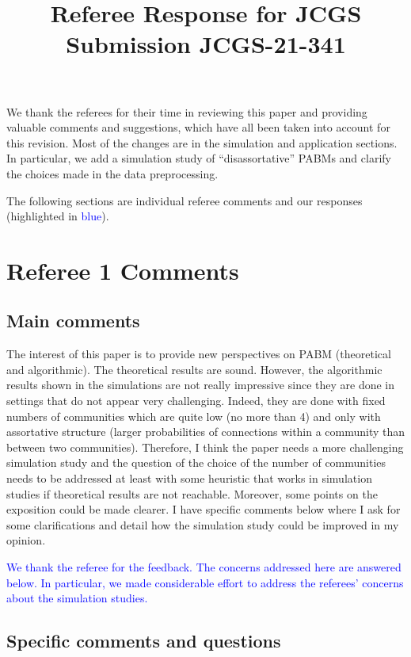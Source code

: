\documentclass[
]{article}
\title{Referee Response for JCGS Submission JCGS-21-341}
\author{}
\date{\vspace{-2.5em}}
\begin{document}
\maketitle

We thank the referees for their time in reviewing this paper and
providing valuable comments and suggestions, which have all been taken
into account for this revision. Most of the changes are in the
simulation and application sections. In particular, we add a simulation
study of ``disassortative'' PABMs and clarify the choices made in the
data preprocessing.

The following sections are individual referee comments and our responses
(highlighted in \textcolor{blue}{blue}).

\hypertarget{referee-1-comments}{%
\section{Referee 1 Comments}\label{referee-1-comments}}

\hypertarget{main-comments}{%
\subsection{Main comments}\label{main-comments}}

The interest of this paper is to provide new perspectives on PABM
(theoretical and algorithmic). The theoretical results are sound.
However, the algorithmic results shown in the simulations are not really
impressive since they are done in settings that do not appear very
challenging. Indeed, they are done with fixed numbers of communities
which are quite low (no more than 4) and only with assortative structure
(larger probabilities of connections within a community than between two
communities). Therefore, I think the paper needs a more challenging
simulation study and the question of the choice of the number of
communities needs to be addressed at least with some heuristic that
works in simulation studies if theoretical results are not reachable.
Moreover, some points on the exposition could be made clearer. I have
specific comments below where I ask for some clarifications and detail
how the simulation study could be improved in my opinion.

\textcolor{blue}{
We thank the referee for the feedback. 
The concerns addressed here are answered below. 
In particular, we made considerable effort to address the referees' concerns about the simulation studies. 
}

\hypertarget{specific-comments-and-questions}{%
\subsection{Specific comments and
questions}\label{specific-comments-and-questions}}
\end{document}
